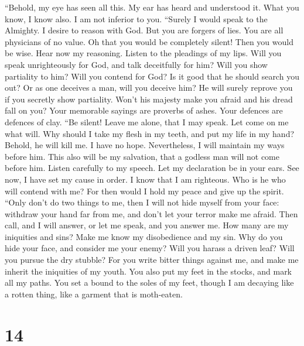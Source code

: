  ``Behold, my eye has seen all this. My ear has heard and
understood it.  What you know, I know also. I am not
inferior to you.  ``Surely I would speak to the Almighty.
I desire to reason with God.  But you are forgers of lies.
You are all physicians of no value.  Oh that you would be
completely silent! Then you would be wise.  Hear now my
reasoning. Listen to the pleadings of my lips.  Will you
speak unrighteously for God, and talk deceitfully for him?
 Will you show partiality to him? Will you contend for
God?  Is it good that he should search you out? Or as one
deceives a man, will you deceive him?  He will surely
reprove you if you secretly show partiality.  Won't his
majesty make you afraid and his dread fall on you?  Your
memorable sayings are proverbs of ashes. Your defences are defences of
clay.  ``Be silent! Leave me alone, that I may speak. Let
come on me what will.  Why should I take my flesh in my
teeth, and put my life in my hand?  Behold, he will kill
me. I have no hope. Nevertheless, I will maintain my ways before him.
 This also will be my salvation, that a godless man will
not come before him.  Listen carefully to my speech. Let
my declaration be in your ears.  See now, I have set my
cause in order. I know that I am righteous.  Who is he
who will contend with me? For then would I hold my peace and give up the
spirit.  ``Only don't do two things to me, then I will
not hide myself from your face:  withdraw your hand far
from me, and don't let your terror make me afraid.  Then
call, and I will answer, or let me speak, and you answer me.
 How many are my iniquities and sins? Make me know my
disobedience and my sin.  Why do you hide your face, and
consider me your enemy?  Will you harass a driven leaf?
Will you pursue the dry stubble?  For you write bitter
things against me, and make me inherit the iniquities of my youth.
 You also put my feet in the stocks, and mark all my
paths. You set a bound to the soles of my feet,  though I
am decaying like a rotten thing, like a garment that is moth-eaten.

\hypertarget{section-13}{%
\section{14}\label{section-13}}

